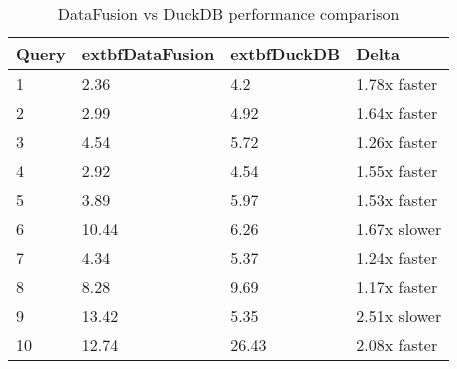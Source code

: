\begin{table}[h]
\centering
\begin{tabular}{|l|l|l|l|}
\hline
Query & 	extbf{DataFusion} & 	extbf{DuckDB} & Delta \\
\hline
1 & 2.36 & 4.2 & 1.78x faster \\
\hline
2 & 2.99 & 4.92 & 1.64x faster \\
\hline
3 & 4.54 & 5.72 & 1.26x faster \\
\hline
4 & 2.92 & 4.54 & 1.55x faster \\
\hline
5 & 3.89 & 5.97 & 1.53x faster \\
\hline
6 & 10.44 & 6.26 & 1.67x slower \\
\hline
7 & 4.34 & 5.37 & 1.24x faster \\
\hline
8 & 8.28 & 9.69 & 1.17x faster \\
\hline
9 & 13.42 & 5.35 & 2.51x slower \\
\hline
10 & 12.74 & 26.43 & 2.08x faster \\
\hline
\end{tabular}
\caption{DataFusion vs DuckDB performance comparison}
\label{table:1}
\end{table}